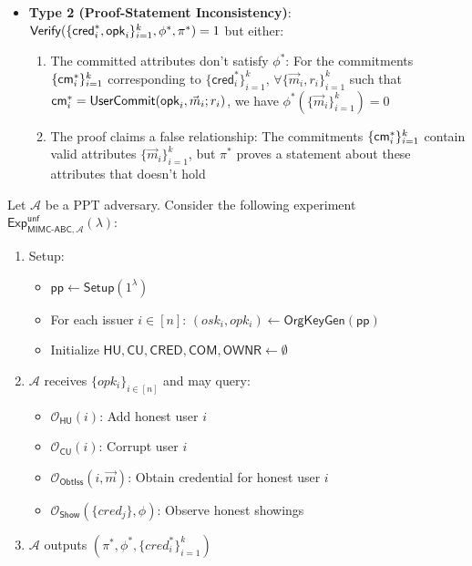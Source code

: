 \begin{enumerate}
\begin{itemize}
        \item \textbf{Type 2 (Proof-Statement Inconsistency)}: 
        $\mathsf{Verify}(\{\mathsf{cred}_i^*, \mathsf{opk}_i\}_{i=1}^k, \phi^*, \pi^*) = 1$ but either:
        \begin{enumerate}
            \item The committed attributes don't satisfy $\phi^*$: 
            For the commitments $\{\mathsf{cm}_i^*\}_{i=1}^k$ corresponding to $\{\mathsf{cred}_i^*\}_{i=1}^k$,
            $\forall \{\vec{m}_i, r_i\}_{i=1}^k$ such that $\mathsf{cm}_i^* = \mathsf{UserCommit}(\mathsf{opk}_i, \vec{m}_i; r_i)$,
            we have $\phi^*(\{\vec{m}_i\}_{i=1}^k) = 0$
            
            \item The proof claims a false relationship: 
            The commitments $\{\mathsf{cm}_i^*\}_{i=1}^k$ contain valid attributes $\{\vec{m}_i\}_{i=1}^k$, but
            $\pi^*$ proves a statement about these attributes that doesn't hold
        \end{enumerate}
    \end{itemize}
\end{enumerate}




\newpage
Let $\mathcal{A}$ be a PPT adversary. Consider the following experiment $\mathsf{Exp}^{\mathsf{unf}}_{\mathsf{MIMC\text{-}ABC},\mathcal{A}}(\lambda)$:
\begin{enumerate}
    \item Setup:
    \begin{itemize}
        \item $\mathsf{pp} \gets \mathsf{Setup}(1^\lambda)$
        \item For each issuer $i \in [n]$: $(osk_i, opk_i) \gets \mathsf{OrgKeyGen}(\mathsf{pp})$
        \item Initialize $\mathsf{HU}, \mathsf{CU}, \mathsf{CRED}, \mathsf{COM}, \mathsf{OWNR} \gets \emptyset$
    \end{itemize}
    
    \item $\mathcal{A}$ receives $\{opk_i\}_{i \in [n]}$ and may query:
    \begin{itemize}
        \item $\mathcal{O}_{\mathsf{HU}}(i)$: Add honest user $i$
        \item $\mathcal{O}_{\mathsf{CU}}(i)$: Corrupt user $i$
        \item $\mathcal{O}_{\mathsf{ObtIss}}(i,\vec{m})$: Obtain credential for honest user $i$
        \item $\mathcal{O}_{\mathsf{Show}}(\{cred_j\}, \phi)$: Observe honest showings
    \end{itemize}
    
    \item $\mathcal{A}$ outputs $(\pi^*, \phi^*, \{cred^*_i\}_{i=1}^k)$
\end{enumerate}

